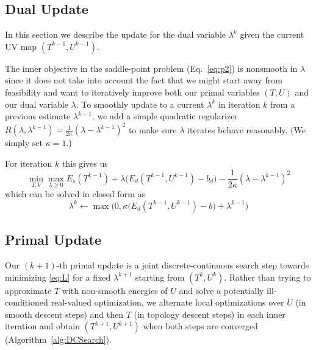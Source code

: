 \subsection{Dual Update}
\label{sec:self_weighting}
\label{sec:dualUpdate}


%
In this section we describe the update for the dual variable $\lambda^k$ given the current UV map $(T^{k-1}, U^{k-1})$.

The inner objective in the saddle-point problem (Eq.~\ref{eq:p2}) is nonsmooth in $\lambda$ since it does not take into account the fact that we might start away from feasibility and want to iteratively improve both our primal variables $(T, U)$ and our dual variable $\lambda$. To smoothly update to a current $\lambda^{k}$ in iteration $k$ from a previous estimate $\lambda^{k-1}$, we add a simple quadratic regularizer $R(\lambda,\lambda^{k-1}) = \frac{1}{2\kappa} (\lambda- \lambda^{k-1})^2$ to make sure $\lambda$ iterates behave reasonably. (We simply set $\kappa = 1$.)

For iteration $k$ this gives us 
\[ \min_{T,V} \max_{\lambda \geq 0} E_{s}(T^{k-1}) + \lambda \big( E_{d}(T^{k-1}, U^{k-1}) - b_d\big) - \frac{1}{2\kappa} (\lambda- \lambda^{k-1})^2 \]
which can be solved in closed form as
\[ \lambda^{k} \leftarrow \max\big(0,\kappa \big( E_{d}(T^{k-1}, U^{k-1}) -b \big) + \lambda^{k-1}\big) \]




\subsection{Primal Update}
\label{sec:primalUpdate}

Our $(k+1)$-th primal update is a joint discrete-continuous search step towards minimizing \eqref{eq:L} for a fixed $\lambda^{k+1}$ starting from $(T^k, U^k)$.
Rather than trying to approximate $T$ with non-smooth energies of $U$ and solve a potentially ill-conditioned real-valued optimization, we alternate local optimizations over $U$ (in smooth descent steps) and then $T$ (in topology descent steps) in each inner iteration and obtain $(T^{k+1}, U^{k+1})$ when both steps are converged (Algorithm~\ref{alg:DCSearch}).

